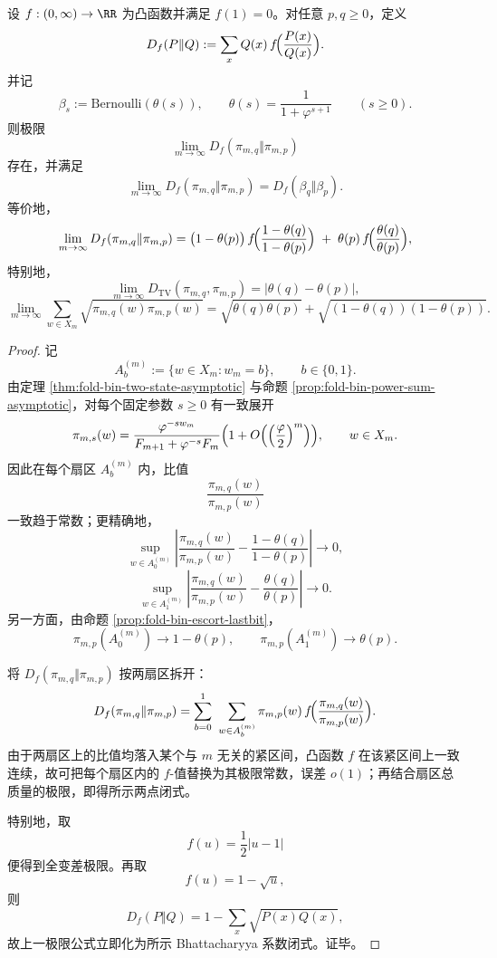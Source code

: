 \begin{theorem}\label{con:xi-time-part9o-escort-fdiv-collapse}
设 \(f:(0,\infty)\to\RR\) 为凸函数并满足 \(f(1)=0\)。对任意 \(p,q\ge 0\)，定义
\[
D_f(P\Vert Q):=\sum_x Q(x)\,f\!\Bigl(\frac{P(x)}{Q(x)}\Bigr).
\]
并记
\[
\beta_s:=\mathrm{Bernoulli}(\theta(s)),
\qquad
\theta(s)=\frac{1}{1+\varphi^{s+1}}
\qquad (s\ge 0).
\]
则极限
\[
\lim_{m\to\infty}D_f(\pi_{m,q}\Vert \pi_{m,p})
\]
存在，并满足
\[
\lim_{m\to\infty}D_f(\pi_{m,q}\Vert \pi_{m,p})
=
D_f(\beta_q\Vert \beta_p).
\]
等价地，
\[
\lim_{m\to\infty}D_f(\pi_{m,q}\Vert \pi_{m,p})
=
\bigl(1-\theta(p)\bigr)\,
f\!\Bigl(\frac{1-\theta(q)}{1-\theta(p)}\Bigr)
\;+\;
\theta(p)\,
f\!\Bigl(\frac{\theta(q)}{\theta(p)}\Bigr),
\]
特别地，
\[
\lim_{m\to\infty}D_{\mathrm{TV}}(\pi_{m,q},\pi_{m,p})=|\theta(q)-\theta(p)|,
\]
\[
\lim_{m\to\infty}\sum_{w\in X_m}\sqrt{\pi_{m,q}(w)\pi_{m,p}(w)}
=
\sqrt{\theta(q)\theta(p)}+\sqrt{(1-\theta(q))(1-\theta(p))}.
\]
\end{theorem}
\begin{proof}
记
\[
A_b^{(m)}:=\{w\in X_m:w_m=b\},
\qquad b\in\{0,1\}.
\]
由定理 \ref{thm:fold-bin-two-state-asymptotic} 与命题 \ref{prop:fold-bin-power-sum-asymptotic}，对每个固定参数 \(s\ge 0\) 有一致展开
\[
\pi_{m,s}(w)
=
\frac{\varphi^{-s w_m}}{F_{m+1}+\varphi^{-s}F_m}
\Bigl(1+O\!\left(\Bigl(\frac{\varphi}{2}\Bigr)^m\right)\Bigr),
\qquad w\in X_m.
\]
因此在每个扇区 \(A_b^{(m)}\) 内，比值
\[
\frac{\pi_{m,q}(w)}{\pi_{m,p}(w)}
\]
一致趋于常数；更精确地，
\[
\sup_{w\in A_0^{(m)}}\left|
\frac{\pi_{m,q}(w)}{\pi_{m,p}(w)}
-\frac{1-\theta(q)}{1-\theta(p)}
\right|
\longrightarrow 0,
\]
\[
\sup_{w\in A_1^{(m)}}\left|
\frac{\pi_{m,q}(w)}{\pi_{m,p}(w)}
-\frac{\theta(q)}{\theta(p)}
\right|
\longrightarrow 0.
\]
另一方面，由命题 \ref{prop:fold-bin-escort-lastbit}，
\[
\pi_{m,p}(A_0^{(m)})\to 1-\theta(p),
\qquad
\pi_{m,p}(A_1^{(m)})\to \theta(p).
\]

将 \(D_f(\pi_{m,q}\Vert \pi_{m,p})\) 按两扇区拆开：
\[
D_f(\pi_{m,q}\Vert \pi_{m,p})
=
\sum_{b=0}^1\ \sum_{w\in A_b^{(m)}}
\pi_{m,p}(w)\,
f\!\Bigl(\frac{\pi_{m,q}(w)}{\pi_{m,p}(w)}\Bigr).
\]
由于两扇区上的比值均落入某个与 \(m\) 无关的紧区间，凸函数 \(f\) 在该紧区间上一致连续，故可把每个扇区内的 \(f\)-值替换为其极限常数，误差 \(o(1)\)；再结合扇区总质量的极限，即得所示两点闭式。

特别地，取
\[
f(u)=\frac12|u-1|
\]
便得到全变差极限。再取
\[
f(u)=1-\sqrt u,
\]
则
\[
D_f(P\Vert Q)=1-\sum_x\sqrt{P(x)Q(x)},
\]
故上一极限公式立即化为所示 Bhattacharyya 系数闭式。证毕。
\end{proof}

